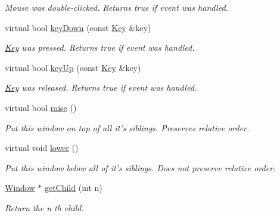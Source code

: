 \begin{DoxyCompactItemize}
\begin{DoxyCompactList}\small\item\em Mouse was double-\/clicked. Returns true if event was handled. \end{DoxyCompactList}\item 
\hypertarget{classGUI_1_1Window_a9d058fb85cb7d5a616e292cc02e01959}{virtual bool \hyperlink{classGUI_1_1Window_a9d058fb85cb7d5a616e292cc02e01959}{key\-Down} (const \hyperlink{classGUI_1_1Key}{Key} \&key)}\label{classGUI_1_1Window_a9d058fb85cb7d5a616e292cc02e01959}

\begin{DoxyCompactList}\small\item\em \hyperlink{classGUI_1_1Key}{Key} was pressed. Returns true if event was handled. \end{DoxyCompactList}\item 
\hypertarget{classGUI_1_1Window_a038bb9134a90795205fdb604977a1520}{virtual bool \hyperlink{classGUI_1_1Window_a038bb9134a90795205fdb604977a1520}{key\-Up} (const \hyperlink{classGUI_1_1Key}{Key} \&key)}\label{classGUI_1_1Window_a038bb9134a90795205fdb604977a1520}

\begin{DoxyCompactList}\small\item\em \hyperlink{classGUI_1_1Key}{Key} was released. Returns true if event was handled. \end{DoxyCompactList}\item 
virtual bool \hyperlink{classGUI_1_1Window_a90890951f6ce5f043657756b2691e754}{raise} ()
\begin{DoxyCompactList}\small\item\em Put this window on top of all it's siblings. Preserves relative order. \end{DoxyCompactList}\item 
\hypertarget{classGUI_1_1Window_a56f2e317a40e65fe867084e5531b19bd}{virtual void \hyperlink{classGUI_1_1Window_a56f2e317a40e65fe867084e5531b19bd}{lower} ()}\label{classGUI_1_1Window_a56f2e317a40e65fe867084e5531b19bd}

\begin{DoxyCompactList}\small\item\em Put this window below all of it's siblings. Does not preserve relative order. \end{DoxyCompactList}\item 
\hypertarget{classGUI_1_1Window_a546dab2fb4ebde2b393465a0962eda8f}{\hyperlink{classGUI_1_1Window}{Window} $\ast$ \hyperlink{classGUI_1_1Window_a546dab2fb4ebde2b393465a0962eda8f}{get\-Child} (int n)}\label{classGUI_1_1Window_a546dab2fb4ebde2b393465a0962eda8f}

\begin{DoxyCompactList}\small\item\em Return the {\ttfamily n} th child. \end{DoxyCompactList}\end{DoxyCompactItemize}
